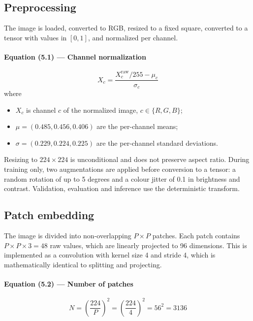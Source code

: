 \documentclass[12pt]{article}
\begin{document}
\subsection{Preprocessing}

The image is loaded, converted to RGB, resized to a fixed square, converted to a tensor with values in $[0,1]$, and normalized per channel.

\paragraph{Equation (5.1) --- Channel normalization}
\begin{equation}
X_c = \frac{X_c^{\mathrm{raw}}/255 - \mu_c}{\sigma_c}
\end{equation}
where
\begin{itemize}[nosep]
\item $X_c$ is channel $c$ of the normalized image, $c \in \{R, G, B\}$;
\item $\mu = (0.485, 0.456, 0.406)$ are the per-channel means;
\item $\sigma = (0.229, 0.224, 0.225)$ are the per-channel standard deviations.
\end{itemize}

Resizing to $224\times224$ is unconditional and does not preserve aspect ratio. During training only, two augmentations are applied before conversion to a tensor: a random rotation of up to 5 degrees and a colour jitter of 0.1 in brightness and contrast. Validation, evaluation and inference use the deterministic transform.

\subsection{Patch embedding}

The image is divided into non-overlapping $P \times P$ patches. Each patch contains $P \times P \times 3 = 48$ raw values, which are linearly projected to 96 dimensions. This is implemented as a convolution with kernel size 4 and stride 4, which is mathematically identical to splitting and projecting.

\paragraph{Equation (5.2) --- Number of patches}
\begin{equation}
N = \left(\frac{224}{P}\right)^2 = \left(\frac{224}{4}\right)^2 = 56^2 = 3136
\end{equation}
\end{document}

